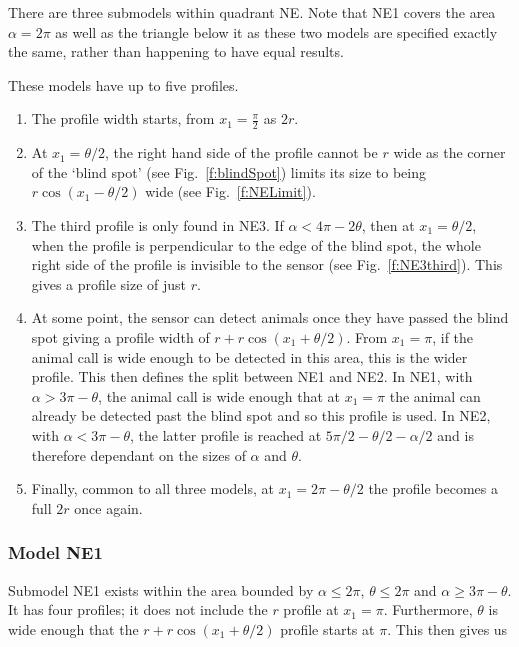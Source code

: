 There are three submodels within quadrant NE. Note that NE1 covers the area $\alpha=2\pi$ as well as the triangle below it as these two models are specified exactly the same, rather than happening to have equal results.

These models have up to five profiles.

\begin{enumerate}
\item The profile width starts, from $x_1=\frac{\pi}{2}$ as $2r$. 
\item At $x_1 = \theta/2$, the right hand side of the profile cannot be $r$ wide as the corner of the `blind spot' (see Fig.~\ref{f:blindSpot}) limits its size to being $r\cos(x_1 - \theta/2)$ wide (see Fig.~\ref{f:NELimit}). 

\item The third profile is only found in NE3. If $\alpha < 4\pi - 2\theta$, then at $x_1=\theta/2$, when the profile is perpendicular to the edge of the blind spot, the whole right side of the profile is invisible to the sensor (see Fig.~\ref{f:NE3third}). This gives a profile size of just $r$.

\item At some point, the sensor can detect animals once they have passed the blind spot giving a profile width of $r + r\cos(x_1 + \theta/2)$. From $x_1=\pi$, if the animal call is wide enough to be detected in this area, this is the wider profile. This then defines the split between NE1 and NE2. In NE1, with $\alpha > 3\pi - \theta$, the animal call is wide enough that at $x_1=\pi$ the animal can already be detected past the blind spot and so this profile is used. In NE2, with $\alpha < 3\pi - \theta$, the latter profile is reached at $5\pi/2 - \theta/2 - \alpha/2$ and is therefore dependant on the sizes of $\alpha$ and $\theta$. 

\item Finally, common to all three models, at $x_1 = 2\pi - \theta/2$ the profile becomes a full $2r$ once again. \label{NElist5}
\end{enumerate}



\subsubsection{Model NE1} \label{NE1}

Submodel NE1 exists within the area bounded by $\alpha\le2\pi$, $\theta\le2\pi$ and $\alpha \ge 3\pi - \theta$. It has four profiles; it does not include the $r$ profile at $x_1=\pi$. Furthermore, $\theta$ is wide enough that the $r + r\cos(x_1 + \theta/2)$ profile starts at $\pi$. This then gives us


